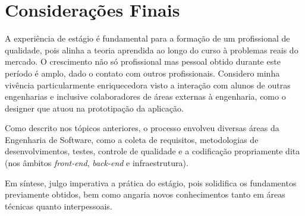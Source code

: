 \chapter[Considerações Finais]{Considerações Finais}

A experiência de estágio é fundamental para a formação de um profissional de
qualidade, pois alinha a teoria aprendida ao longo do curso à problemas reais do
mercado. O crescimento não só profissional mas pessoal obtido durante este
período é amplo, dado o contato com outros profissionais. Considero minha
vivência particularmente enriquecedora visto a interação com alunos de outras
engenharias e inclusive colaboradores de áreas externas à engenharia, como o
designer que atuou na prototipação da aplicação.

Como descrito nos tópicos anteriores, o processo envolveu diversas áreas da
Engenharia de Software, como a coleta de requisitos, metodologias de
desenvolvimentos, testes, controle de qualidade e a codificação propriamente
dita (nos âmbitos \textit{front-end}, \textit{back-end} e infraestrutura).

Em síntese, julgo imperativa a prática do estágio, pois solidifica os
fundamentos previamente obtidos, bem como angaria novos conhecimentos tanto em
áreas técnicas quanto interpessoais.
